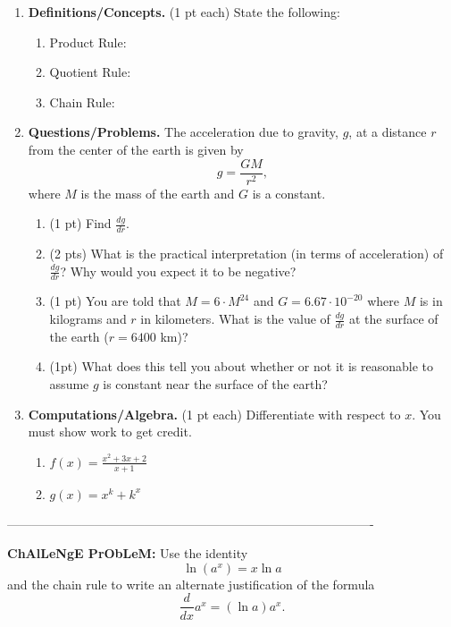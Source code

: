 \documentclass[11pt,letterpaper]{article}
\begin{document}
\begin{enumerate}
\item  \textbf{Definitions/Concepts.} (1 pt each)  State the following:
\begin{enumerate}
 \item Product Rule:

\vspace{4pc}
 \item Quotient Rule:

\vspace{4pc}
 \item Chain Rule:

\end{enumerate}

\vspace{3pc}
\item \textbf{Questions/Problems.}  The acceleration due to gravity, $g$, at a
distance $r$ from the center of the earth is given by
\[g=\frac{GM}{r^2},\]
where $M$ is the mass of the earth and $G$ is a constant.

\begin{enumerate}
\item (1 pt) Find $\frac{dg}{dr}$.

\vspace{3pc}
\item (2 pts) What is the practical interpretation (in terms of acceleration) of
$\frac{dg}{dr}$?  Why would you expect it to be negative?

\vspace{3pc}
\item (1 pt) You are told that $M=6\cdot M^{24}$ and $G=6.67\cdot 10^{-20}$
where $M$ is in kilograms and $r$ in kilometers.  What is the value of
$\frac{dg}{dr}$ at the surface of the earth ($r=6400$ km)?

\vspace{3pc}
\item (1pt) What does this tell you about whether or not it is reasonable to
assume $g$ is constant near the surface of the earth?
 
\end{enumerate}
 
\vspace{2pc}
\item \textbf{Computations/Algebra.} (1 pt each) Differentiate with respect to
$x$.  You must show work to get credit.
\begin{enumerate}
\item $f(x)=\frac{x^2 +3x+2}{x+1}$

\vspace{4pc}
\item $g(x)=x^k +k^x$

\end{enumerate}

\end{enumerate}

\vspace{4pc}
----------------------------------------------------------------------------------------

\vspace{1pc}
\noindent \textbf{ChAlLeNgE PrObLeM:}  Use the identity 
\[\ln{(a^x)}=x\ln{a}\]
and the chain rule to write an alternate justification of the formula 
\[\frac{d}{dx}a^x=(\ln{a})a^x.\]
\end{document}
